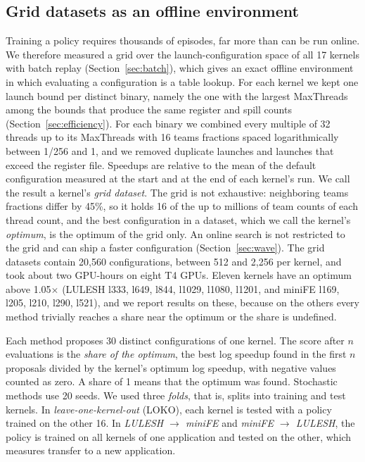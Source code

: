 \documentclass[10pt]{article}
\newcommand{\x}{\ensuremath{\times}}
\begin{document}
\subsection{Grid datasets as an offline environment}
Training a policy requires thousands of episodes, far more than can be run
online. We therefore measured a grid over the launch-configuration space of all
17 kernels with batch replay (Section~\ref{sec:batch}), which gives an exact
offline environment in which evaluating a configuration is a table lookup.
For each kernel we kept one launch bound per distinct binary, namely the one
with the largest MaxThreads among the bounds that produce the same register
and spill counts (Section~\ref{sec:efficiency}). For each binary we combined
every multiple of 32 threads up to its MaxThreads with 16 teams fractions
spaced logarithmically between 1/256 and 1, and we removed duplicate launches
and launches that exceed the register file. Speedups are relative to the mean
of the default configuration measured at the start and at the end of each
kernel's run. We call the result a kernel's \emph{grid dataset}. The grid is
not exhaustive: neighboring teams fractions differ by 45\%, so it holds 16
of the up to millions of team counts of each thread count, and the best
configuration in a dataset, which we call the kernel's \emph{optimum}, is the
optimum of the grid only. An online search is not restricted to the grid and
can ship a faster configuration (Section~\ref{sec:wave}). The grid datasets contain 20{,}560 configurations, between
512 and 2{,}256 per kernel, and took about two GPU-hours on eight T4 GPUs.
Eleven kernels have an optimum above 1.05\x{} (LULESH l333, l649, l844,
l1029, l1080, l1201, and miniFE l169, l205, l210, l290, l521), and we report
results on these, because on the others every method trivially reaches a
share near the optimum or the share is undefined.

Each method proposes 30 distinct configurations of one kernel. The score
after $n$ evaluations is the \emph{share of the optimum}, the best log
speedup found in the first $n$ proposals divided by the kernel's optimum log
speedup, with negative values counted as zero. A share of 1 means that the
optimum was found. Stochastic methods use 20 seeds. We used three
\emph{folds}, that is, splits into training and test kernels. In
\emph{leave-one-kernel-out} (LOKO), each kernel is tested with a policy
trained on the other 16. In \emph{LULESH $\to$ miniFE} and \emph{miniFE $\to$
LULESH}, the policy is trained on all kernels of one application and tested
on the other, which measures transfer to a new application.
\end{document}
